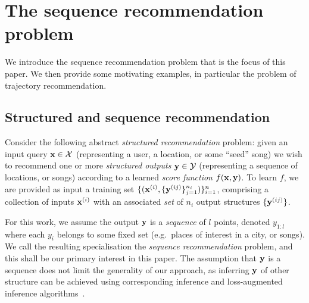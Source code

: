 
\secmoveup
\section{The sequence recommendation problem}
\label{sec:recseq}
\textmoveup

We introduce the sequence recommendation problem that is the focus of this paper.
We then provide some motivating examples, in particular the problem of trajectory recommendation.


%
%

%
\subsection{Structured and sequence recommendation}
\label{sec:seqrec-defn}

Consider the following abstract
\emph{structured recommendation} problem:
given an input query $\mathbf{x} \in \mathcal{X}$ (representing \eg a user, a location, or some ``seed'' song)
we wish to recommend one or more \emph{structured outputs} $\mathbf{y} \in \mathcal{Y}$ (representing \eg a sequence of locations, or songs)
according to a learned \emph{score function} $f(\mathbf{x},\mathbf{y})$.
To learn $f$,
we are provided as input a training set
$\{ ( \mathbf{x}^{({i})}, \{ \mathbf{y}^{({ij})} \}_{j=1}^{n_i} ) \}_{i=1}^{n}$,
comprising a collection of inputs $\mathbf{x}^{({i})}$ with an associated \emph{set} of $n_i$ output structures $\{ \mathbf{y}^{({ij})} \}$.

For this work, we assume the output $\mathbf{y}$ is a \emph{sequence} of $l$ points, denoted $y_{1:l}$
where each $y_i$ belongs to some fixed set (e.g.\ places of interest in a city, or songs).
We call the resulting specialisation the \emph{sequence recommendation} problem,
and this shall be our primary interest in this paper.
The assumption that $\mathbf{y}$ is a sequence does not limit the generality of our approach,
as inferring $\mathbf{y}$ of other structure can be achieved using corresponding inference and loss-augmented inference algorithms~\cite{joachims2009predicting}.  %


